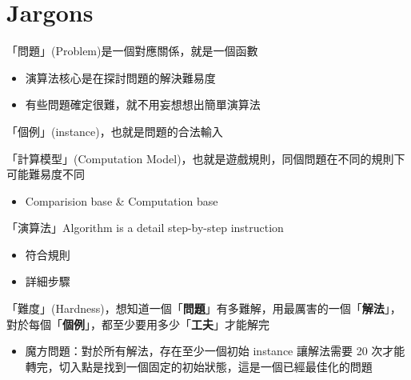 \newpage

\section{Jargons}
\begin{definition}[Problems]
    「問題」(Problem)是一個對應關係，就是一個函數
    \begin{itemize}
        \item 演算法核心是在探討問題的解決難易度
        \item 有些問題確定很難，就不用妄想想出簡單演算法
    \end{itemize}
\end{definition}

\begin{definition}[Instance]
    「個例」(instance)，也就是問題的合法輸入
\end{definition}

\begin{definition}
    「計算模型」(Computation Model)，也就是遊戲規則，同個問題在不同的規則下可能難易度不同

    \begin{itemize}
        \item Comparision base \& Computation base
    \end{itemize}
    
\end{definition}

\begin{definition}[Algorithm]
    「演算法」Algorithm is a detail step-by-step instruction
    \begin{itemize}
        \item 符合規則
        \item 詳細步驟
    \end{itemize}
\end{definition}

\begin{definition}[Hardness]
    「難度」(Hardness)，想知道一個「\textbf{問題}」有多難解，用最厲害的一個「\textbf{解法}」，對於每個「\textbf{個例}」，都至少要用多少「\textbf{工夫}」才能解完
\end{definition}

\begin{itemize}
    \item 魔方問題：對於所有解法，存在至少一個初始 instance 讓解法需要 20 次才能轉完，切入點是找到一個固定的初始狀態，這是一個已經最佳化的問題
\end{itemize}

